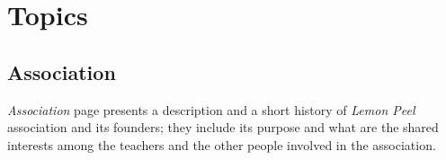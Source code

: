 \documentclass[../../DD.tex]{subfiles}
\begin{document}
\newpage
\section{Topics}
	\subsection{Association}
		\textit{Association} page presents a description and a short history of \textit{Lemon Peel} association and its founders; they include its purpose and what are the shared interests among the teachers and the other people involved in the association.

\end{document}
